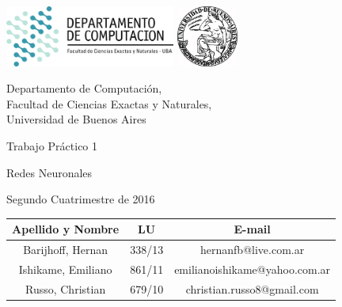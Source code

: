 \documentclass[a4paper, 10pt, twoside]{article}
\newcommand{\titulo}{Trabajo Práctico 1}
\newcommand{\materia}{Redes Neuronales}
\newcommand{\cuatrimestre}{Segundo Cuatrimestre de 2016}
\begin{document}


\thispagestyle{caratula}

\begin{center}

\includegraphics[height=2cm]{DC.png} 
\hfill
\includegraphics[height=2cm]{UBA.jpg} 

\vspace{2cm}

Departamento de Computación,\\
Facultad de Ciencias Exactas y Naturales,\\
Universidad de Buenos Aires

\vspace{4cm}

\begin{Huge}
\titulo
\end{Huge}

\vspace{0.5cm}

\begin{Large}
\materia
\end{Large}

\vspace{1cm}

\cuatrimestre

\vspace{4cm}

\begin{tabular}{|c|c|c|}
\hline
Apellido y Nombre & LU & E-mail\\
\hline
Barijhoff, Hernan           & 338/13 & hernanfb@live.com.ar \\
Ishikame, Emiliano               & 861/11 & emilianoishikame@yahoo.com.ar \\
Russo, Christian              & 679/10 & christian.russo8@gmail.com\\
\hline
\end{tabular}

\end{center}
\end{document}
